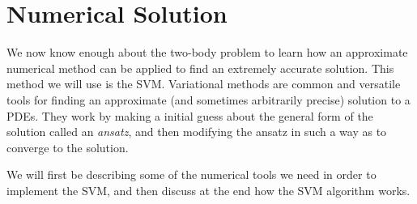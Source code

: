 \documentclass[
  a4paper,             %
  11pt,                %
  oneside,             %
  onecolumn,           %
  bibliography=totoc,  %
  final,               %
]{scrartcl}
\newcounter{question}
\newenvironment{question}{%
  \stepcounter{question}%
  \begin{tcolorbox}[
      colframe=black,
      sharp corners=all,
      boxsep=0.5ex,
    ]
    \noindent\textsc{\large Question \arabic{question}:} %
}{%
  \end{tcolorbox}%
}
\begin{document}



\cleardoublepage
\section{Numerical Solution}
\label{sec:numerical_solution}

We now know enough about the two-body problem to learn how an approximate
numerical method can be applied to find an extremely accurate solution.  This
method we will use is the \gls{SVM}.  Variational methods are common and
versatile tools for finding an approximate (and sometimes arbitrarily precise)
solution to a \glspl{PDE}.  They work by making a initial guess about the general
form of the solution called an \emph{ansatz}, and then modifying the ansatz in
such a way as to converge to the solution.

We will first be describing some of the numerical tools we need in order to
implement the \gls{SVM}, and then discuss at the end how the \gls{SVM} algorithm
works.
\end{document}

